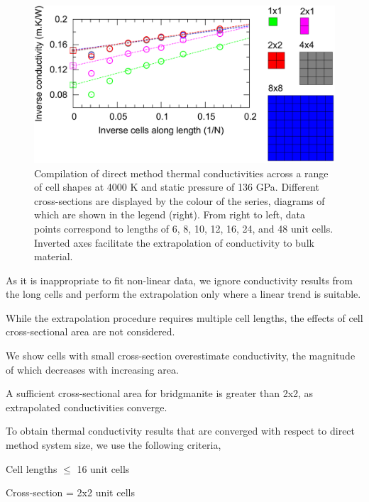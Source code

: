 \documentclass[%
preprint,                                  %
nofootinbib,
 amsmath,amssymb,
 aps,
]{revtex4-1}
\begin{document}
\begin{figure}[h]
  \includegraphics[width=\linewidth]{images/all_data.png}
  \caption{Compilation of direct method thermal conductivities across a range of cell shapes at 4000 K and static pressure of 136 GPa. Different cross-sections are displayed by the colour of the series, diagrams of which are shown in the legend (right). From right to left, data points correspond to lengths of 6, 8, 10, 12, 16, 24, and 48 unit cells. Inverted axes facilitate the extrapolation of conductivity to bulk material.}
  \label{fig:all_data}
\end{figure}

As it is inappropriate to fit non-linear data, we ignore conductivity results from the long cells and perform the extrapolation only where a linear trend is suitable.

While the extrapolation procedure requires multiple cell lengths, the effects of cell cross-sectional area are not considered. 

We show cells with small cross-section overestimate conductivity, the magnitude of which decreases with increasing area. 

A sufficient cross-sectional area for bridgmanite is greater than 2x2, as extrapolated conductivities converge. 

To obtain thermal conductivity results that are converged with respect to direct method system size, we use the following criteria,

Cell lengths $\leq$ 16 unit cells

Cross-section = 2x2 unit cells
\end{document}
